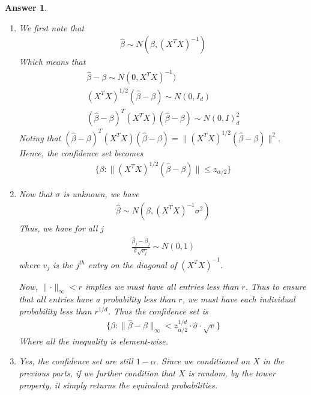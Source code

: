 \documentclass[12pt]{article}
\theoremstyle{colon}
\newtheorem*{answer}{Answer}
\begin{document}
\begin{answer}
  \leavevmode
  \begin{enumerate}[label=\arabic*)]
    \item We first note that
      \begin{gather*}
        \widehat{\beta} \sim N(\beta, (X^T X)^{-1})
      \end{gather*}
      Which means that
      \begin{gather*}
        \widehat{\beta} - \beta \sim N(0, X^T X)^{-1}) \\
        (X^T X)^{1/2} (\widehat{\beta} - \beta) \sim N(0, I_d) \\
        (\widehat{\beta} - \beta)^T (X^T X) (\widehat{\beta} - \beta) \sim N(0, I)_d^2
      \end{gather*}
      Noting that $(\widehat{\beta} - \beta)^T (X^T X) (\widehat{\beta} - \beta) = \lVert (X^T X)^{1/2} (\widehat{\beta} - \beta) \rVert^2$. Hence, the confidence set becomes
      \begin{gather*}
        \{ \beta : \lVert (X^T X)^{1/2} (\widehat{\beta} - \beta) \rVert \leq z_{\alpha/2} \}
      \end{gather*}
    \item Now that $\sigma$ is unknown, we have
      \begin{gather*}
        \widehat{\beta} \sim N(\beta, (X^T X)^{-1} \sigma^2)
      \end{gather*}
      Thus, we have for all $j$
      \begin{gather*}
        \frac{\widehat{\beta}_j - \beta_j}{\widehat{\sigma} \sqrt{v_j}} \sim N(0, 1)
      \end{gather*}
      where $v_j$ is the $j^{th}$ entry on the diagonal of $(X^T X)^{-1}$.

      Now, $\lVert \cdot \rVert_\infty < r$ implies we must have all entries less than $r$. Thus to ensure that all entries have a probability less than $r$, we must have each individual probability less than $r^{1/d}$. Thus the confidence set is
      \begin{gather*}
        \{ \beta : \lVert \widehat{\beta} - \beta \rVert_\infty < z_{\alpha/2}^{1/d} \cdot \widehat{\sigma} \cdot \sqrt{v} \}
      \end{gather*}
      Where all the inequality is element-wise.
    \item Yes, the confidence set are still $1-\alpha$. Since we conditioned on $X$ in the previous parts, if we further condition that $X$ is random, by the tower property, it simply returns the equivalent probabilities.
  \end{enumerate}
\end{answer}
\end{document}
